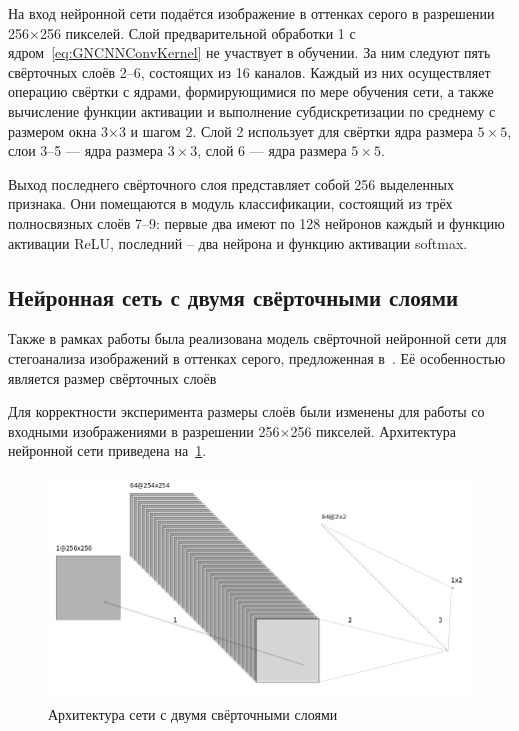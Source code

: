 На вход нейронной сети подаётся изображение в оттенках серого в разрешении 256×256 пикселей. Слой предварительной обработки 1 с ядром~\eqref{eq:GNCNNConvKernel} не участвует в обучении. За ним следуют пять свёрточных слоёв 2--6, состоящих из 16 каналов. Каждый из них осуществляет операцию свёртки с ядрами, формирующимися по мере обучения сети, а также вычисление функции активации и выполнение субдискретизации по среднему с размером окна 3×3 и шагом 2. Слой 2 использует для свёртки ядра размера $ 5 \times 5 $, слои 3--5 --- ядра размера $ 3 \times 3 $, слой 6 --- ядра размера $ 5 \times 5 $.

Выход последнего свёрточного слоя представляет собой 256 выделенных признака. Они помещаются в модуль классификации, состоящий из трёх полносвязных слоёв 7--9: первые два имеют по 128 нейронов каждый и функцию активации ReLU, последний – два нейрона и функцию активации softmax.

\subsection{Нейронная сеть с двумя свёрточными слоями}

Также в рамках работы была реализована модель свёрточной нейронной сети для стегоанализа изображений в оттенках серого, предложенная в~\cite{FrenchCNN}. Её особенностью является размер свёрточных слоёв

Для корректности эксперимента размеры слоёв были изменены для работы со входными изображениями в разрешении 256×256 пикселей. Архитектура нейронной сети приведена на~\ref{fig:FrenchCNNArchitecture}.

\begin{figure}[!htb]
\centering
\includegraphics[width=1\textwidth]{include/graphics/french_gray_architecture}
\caption{Архитектура сети с двумя свёрточными слоями}
\label{fig:FrenchCNNArchitecture}
\end{figure}

